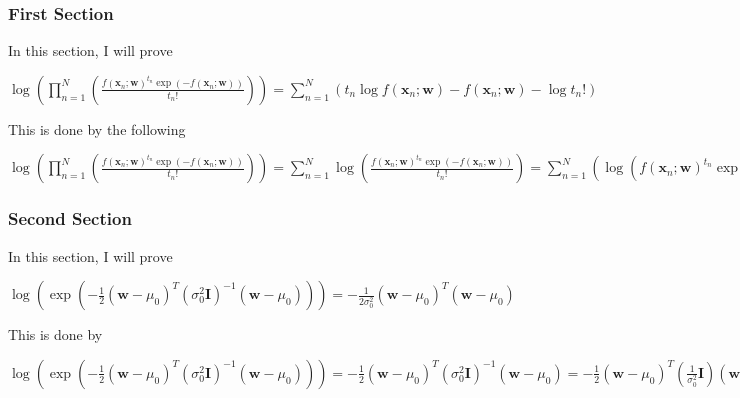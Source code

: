 \documentclass{report}
\begin{document}
\subsubsection*{First Section}
In this section, I will prove 
\begin{center}
    \begin{math}
        \log \left( \prod_{n = 1}^N \left( \frac{f(\bm{x}_n; \bm{w})^{t_n}\exp(-f(\bm{x}_n; \bm{w}))}{t_n!}\right) \right) = \sum^N_{n = 1} \left( t_n \log f(\bm{x}_n; \bm{w}) - f(\bm{x}_n; \bm{w}) - \log t_n ! \right)
    \end{math}
\end{center}
This is done by the following
\begin{center}
    \begin{math}
        \log \left( \prod_{n = 1}^N \left( \frac{f(\bm{x}_n; \bm{w})^{t_n}\exp(-f(\bm{x}_n; \bm{w}))}{t_n!}\right) \right)
        = \sum^N_{n = 1} \log \left( \frac{f(\bm{x}_n; \bm{w})^{t_n}\exp(-f(\bm{x}_n; \bm{w}))}{t_n!}\right) 
        = \sum^N_{n = 1} \left( \log(f(\bm{x}_n; \bm{w})^{t_n}\exp(-f(\bm{x}_n; \bm{w}))) - \log t_n! \right)
        = \sum^N_{n = 1} \left( \log f(\bm{x}_n; \bm{w})^{t_n} + \log \exp(-f(\bm{x}_n; \bm{w})) - \log t_n! \right)
        = \sum^N_{n = 1} \left( t_n \log f(\bm{x}_n; \bm{w}) -f(\bm{x}_n; \bm{w}) - \log t_n! \right)
    \end{math}
\end{center}

\subsubsection*{Second Section}
In this section, I will prove 
\begin{center}
    \begin{math}
        \log \left( \exp(-\frac{1}{2}(\bm{w} - \mu_0)^T(\sigma_0^2\bm{I})^{-1}(\bm{w} - \mu_0)) \right) 
        = -\frac{1}{2 \sigma_0^2}(\bm{w} - \mu_0)^T (\bm{w} - \mu_0)
    \end{math}
\end{center}
This is done by
\begin{center}
    \begin{math}
        \log \left( \exp(-\frac{1}{2}(\bm{w} - \mu_0)^T(\sigma_0^2\bm{I})^{-1}(\bm{w} - \mu_0)) \right) 
        = -\frac{1}{2}(\bm{w} - \mu_0)^T(\sigma_0^2\bm{I})^{-1}(\bm{w} - \mu_0)
        = -\frac{1}{2}(\bm{w} - \mu_0)^T(\frac{1}{\sigma_0^2}\bm{I})(\bm{w} - \mu_0)
        = -\frac{1}{2} \frac{1}{\sigma_0^2} (\bm{w} - \mu_0)^T\bm{I}(\bm{w} - \mu_0)
        = -\frac{1}{2 \sigma_0^2} (\bm{w} - \mu_0)^T(\bm{w} - \mu_0)
    \end{math}
\end{center}
\end{document}
